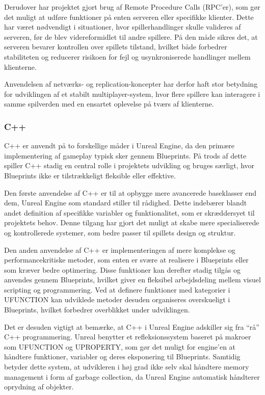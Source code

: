 Derudover har projektet gjort brug af Remote Procedure Calls (RPC’er), som gør det muligt at udføre funktioner på enten serveren eller specifikke klienter. Dette har været nødvendigt i situationer, hvor spillerhandlinger skulle valideres af serveren, før de blev videreformidlet til andre spillere. På den måde sikres det, at serveren bevarer kontrollen over spillets tilstand, hvilket både forbedrer stabiliteten og reducerer risikoen for fejl og usynkroniserede handlinger mellem klienterne.

Anvendelsen af netværks- og replication-koncepter har derfor haft stor betydning for udviklingen af et stabilt multiplayer-system, hvor flere spillere kan interagere i samme spilverden med en ensartet oplevelse på tværs af klienterne.

\subsubsection{C++}
C++ er anvendt på to forskellige måder i Unreal Engine, da den primære implementering af gameplay typisk sker gennem Blueprints. På trods af dette spiller C++ stadig en central rolle i projektets udvikling og bruges særligt, hvor Blueprints ikke er tilstrækkeligt fleksible eller effektive.

Den første anvendelse af C++ er til at opbygge mere avancerede baseklasser end dem, Unreal Engine som standard stiller til rådighed. Dette indebærer blandt andet definition af specifikke variabler og funktionalitet, som er skræddersyet til projektets behov. Denne tilgang har gjort det muligt at skabe mere specialiserede og kontrollerede systemer, som bedre passer til spillets design og struktur.

Den anden anvendelse af C++ er implementeringen af mere komplekse og performancekritiske metoder, som enten er svære at realisere i Blueprints eller som kræver bedre optimering. Disse funktioner kan derefter stadig tilgås og anvendes gennem Blueprints, hvilket giver en fleksibel arbejdsdeling mellem visuel scripting og programmering. Ved at definere funktioner med kategorier i UFUNCTION kan udviklede metoder desuden organiseres overskueligt i Blueprints, hvilket forbedrer overblikket under udviklingen.

Det er desuden vigtigt at bemærke, at C++ i Unreal Engine adskiller sig fra “rå” C++ programmering. Unreal benytter et refleksionssystem baseret på makroer som UFUNCTION og UPROPERTY, som gør det muligt for engine’en at håndtere funktioner, variabler og deres eksponering til Blueprints. Samtidig betyder dette system, at udvikleren i høj grad ikke selv skal håndtere memory management i form af garbage collection, da Unreal Engine automatisk håndterer oprydning af objekter.

